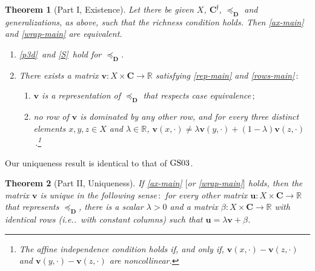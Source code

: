 \documentclass[ecta,nameyear,draft]{econsocart}
\makeatletter
\newcommand{\R}{\mathbb R}
\newcommand{\novel}{\mathfrak f}
\newcommand{\preceqb}{\mathbin{\preceq}}
\newcommand{\mbbd}{{\mathbf D}}
\newcommand{\mbbc}{{\mathbf C}}
\newcommand{\mbbcp}{{\mathbf C^{\novel}}}
\newcommand{\mbbt}{{\mathbf {T}}}
\newcommand\ie{i\@.e\@ifnextchar.{}{.\@}}
\newcommand{\gsii}{$\textup{GS03}$}
\theoremstyle{plain}
\newtheorem{theorem}{Theorem}%
\theoremstyle{remark}
\makeatother
\begin{document}
\begin{theorem}[Part I, Existence]\label{thm-main} Let there be given $X$,
  $\mbbcp$, $\preceqb_ \mbbd$ and generalizations, as above, such that the
  richness condition holds. Then \ref{ax-main} and \ref{wrap-main} are
  equivalent.
  \begin{enumerate}[label=\textup{(\ref{thm-main}.\roman*)}]
    \item\label{ax-main} \ref{p3d}\ and \ref{S}\ hold for $\preceq_{\mbbd}$.
    \item\label{wrap-main} There exists a matrix $\mathbf{v} : X \times \mbbc
      \rightarrow \R$ satisfying \ref{rep-main} and \ref{rows-main}$\,:$
      \begin{enumerate}[label=\textup{(\ref{thm-main}.\alph*)}]
        \item\label{rep-main} $\mathbf{v}$ is a representation of
          $\preceq_{\mbbd}$ that respects case equivalence$\,;$
        \item\label{rows-main} no row of $\mathbf{v}$ is dominated by any other
          row, and for every three distinct elements $x,y, z \in X$ and
          $\lambda \in \R$, $\mathbf{v} (x, \cdot) \neq \lambda
          \mathbf{v}(y,\cdot) + (1-\lambda)
          \mathbf{v}(z,\cdot)$\,.\footnote{The affine independence condition 
            holds if, and only if, $\mathbf{v}(x,\cdot)- \mathbf{v}(z,\cdot)$
          and $\mathbf{v}(y,\cdot)-\mathbf{v}(z,\cdot)$ are noncollinear.}
      \end{enumerate}
  \end{enumerate}
\end{theorem}
Our uniqueness result is identical to that of \gsii.  \setcounter{theorem}{0}
\begin{theorem}[Part II, Uniqueness]%
  If \ref{ax-main} $[$or \ref{wrap-main}$]$ holds, then the matrix $\mathbf{v}$
  is unique in the following sense$\,:$ for every other matrix $\mathbf{u} : X
  \times \mbbc \rightarrow \R$ that represents $\preceqb_{\mbbd}$, there is a
  scalar $\lambda > 0$ and a matrix $\beta : X \times \mbbc \rightarrow \R$
  with identical rows (\ie\ with constant columns) such that $\mathbf{u} =
  \lambda \mathbf{v} + \beta$.
\end{theorem}

\end{document}
